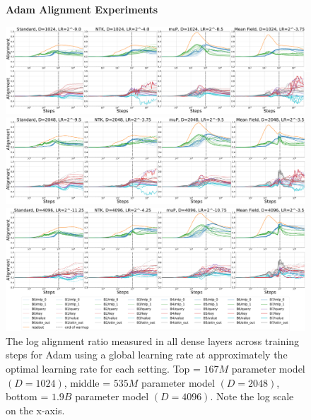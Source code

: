 \begin{figure}[ht]
    \begin{center}
        \textbf{Adam Alignment Experiments}\\
        \figvspace
        
        \includegraphics[width=\linewidth, trim={0, 0, 0, 0},clip]{icml2024/figures/alignment/appendix/adamw_1024.pdf}
       
        \figvspace
        \figvspace
       
        \includegraphics[width=\linewidth, trim={0, 0, 0, 0},clip]{icml2024/figures/alignment/appendix/adamw_2048.pdf}
       
        \figvspace
        \figvspace
       
        \includegraphics[width=\linewidth, trim={0, 0, 0, 0},clip]{icml2024/figures/alignment/appendix/adamw_4096_legend.pdf}
        \caption{The log alignment ratio measured in all dense layers across training steps for Adam using a global learning rate at approximately the optimal learning rate for each setting. Top = $167M$ parameter model $(D=1024)$, middle = $535M$ parameter model $(D=2048)$, bottom = $1.9B$ parameter model $(D=4096)$. Note the log scale on the x-axis.}
        \label{fig:appendix_alignment_adam}
    \end{center}
\end{figure}
\newpage


